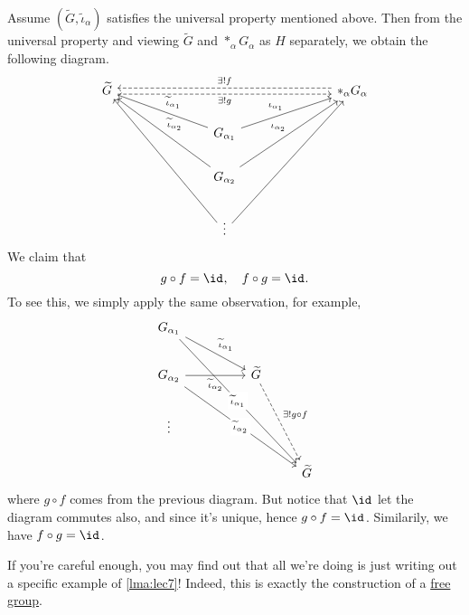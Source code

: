 \begin{explanation}
	Assume \((\widetilde{G} , \widetilde{\iota} _\alpha  )\) satisfies the universal property mentioned above. Then from the universal property and viewing \(\widetilde{G} \) and
	\(\ast_\alpha G_\alpha \) as \(H\) separately, we obtain the following diagram.
	\[
		\begin{tikzcd}
			{\widetilde{G}} &&&&&& {\ast_\alpha G_\alpha} \\
			&&& {G_{\alpha_1}} \\
			&&& {G_{\alpha_2}} \\
			&&& \vdots
			\arrow["{\iota_{\alpha_1}}", from=2-4, to=1-7]
			\arrow["{\iota_{\alpha_2}}", from=3-4, to=1-7]
			\arrow["{\exists ! f}"', shift right=1, dashed, from=1-7, to=1-1]
			\arrow["{\widetilde{\iota}_{\alpha_1}}"', from=2-4, to=1-1]
			\arrow["{\widetilde{\iota}_{\alpha_2}}"', from=3-4, to=1-1]
			\arrow[from=4-4, to=1-1]
			\arrow[from=4-4, to=1-7]
			\arrow["{\exists! g}"', shift right=1, dashed, from=1-1, to=1-7]
		\end{tikzcd}
	\]
	We claim that
	\[
		g\circ f = \id_{},\quad f\circ g = \id_{}.
	\]
	To see this, we simply apply the same observation, for example,
	\[
		\begin{tikzcd}
			{G_{\alpha_1}} \\
			{G_{\alpha_2}} && {\widetilde{G}} \\
			\vdots \\
			&&& {\widetilde{G}}
			\arrow["{\widetilde{\iota}_{\alpha_1}}", from=1-1, to=2-3]
			\arrow["{\widetilde{\iota}_{\alpha_2}}"', from=2-1, to=2-3]
			\arrow["{\exists ! g\circ f}", dashed, from=2-3, to=4-4]
			\arrow["{\widetilde{\iota}_{\alpha_1}}"{description}, from=1-1, to=4-4]
			\arrow["{\widetilde{\iota}_{\alpha_2}}"{description}, from=2-1, to=4-4]
		\end{tikzcd}
	\]
	where \(g\circ f\) comes from the previous diagram. But notice that \(\id_{} \) let the diagram commutes also, and since it's unique, hence \(g\circ f = \id_{} \). Similarily,
	we have \(f\circ g = \id_{} \).
\end{explanation}

If you're careful enough, you may find out that all we're doing is just writing out a specific example of \autoref{lma:lec7}! Indeed, this is exactly the construction of a
\hyperref[def:free-group]{free group}.

